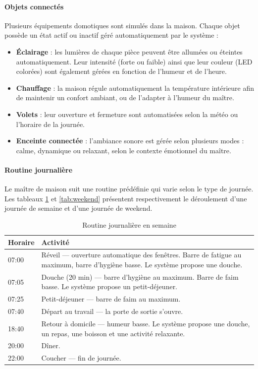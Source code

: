 \paragraph{Objets connectés} Plusieurs équipements domotiques sont simulés dans la maison. 
Chaque objet possède un état actif ou inactif géré automatiquement par le système :
\begin{itemize}
    \item \textbf{Éclairage} : les lumières de chaque pièce peuvent être allumées ou 
    éteintes automatiquement. Leur intensité (forte ou faible) ainsi que leur couleur 
    (LED colorées) sont également gérées en fonction de l'humeur et de l'heure.
    \item \textbf{Chauffage} : la maison régule automatiquement la température intérieure 
    afin de maintenir un confort ambiant, ou de l'adapter à l'humeur du maître.
    \item \textbf{Volets} : leur ouverture et fermeture sont automatisées selon la météo 
    ou l'horaire de la journée.
    \item \textbf{Enceinte connectée} : l'ambiance sonore est gérée selon plusieurs 
    modes : calme, dynamique ou relaxant, selon le contexte émotionnel du maître.
\end{itemize}

\paragraph{Routine journalière} Le maître de maison suit une routine prédéfinie qui varie 
selon le type de journée. Les tableaux \ref{tab:semaine} et \ref{tab:weekend} présentent 
respectivement le déroulement d'une journée de semaine et d'une journée de weekend.

\begin{table}[h!]
\centering
\begin{tabular}{|p{2.5cm}|p{9.5cm}|}
\hline
\textbf{Horaire} & \textbf{Activité} \\
\hline
07:00 & Réveil — ouverture automatique des fenêtres. Barre de fatigue au maximum, 
barre d'hygiène basse. Le système propose une douche. \\
\hline
07:05 & Douche (20 min) — barre d'hygiène au maximum. Barre de faim basse. 
Le système propose un petit-déjeuner. \\
\hline
07:25 & Petit-déjeuner — barre de faim au maximum. \\
\hline
07:40 & Départ au travail — la porte de sortie s'ouvre. \\
\hline
18:40 & Retour à domicile — humeur basse. Le système propose une douche, 
un repas, une boisson et une activité relaxante. \\
\hline
20:00 & Dîner. \\
\hline
22:00 & Coucher — fin de journée. \\
\hline
\end{tabular}
\caption{Routine journalière en semaine}
\label{tab:semaine}
\end{table}

